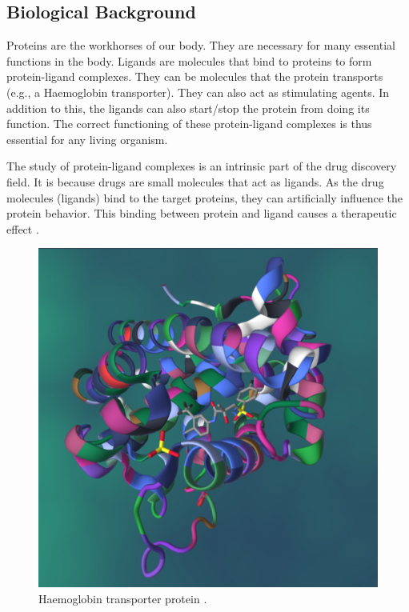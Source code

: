 \documentclass[11pt]{article}
\begin{document}
\subsection{Biological Background}
Proteins are the workhorses of our body.  They are necessary for many essential functions in the body.  Ligands are molecules that bind to proteins to form protein-ligand complexes.  They can be molecules that the protein transports (e.g., a Haemoglobin transporter). They can also act as stimulating agents.  In addition to this, the ligands can also start/stop the protein from doing its function. The correct functioning of these protein-ligand complexes is thus essential for any living organism.

The study of protein-ligand complexes is an intrinsic part of the drug discovery field. It is because drugs are small molecules that act as ligands. As the drug molecules (ligands) bind to the target proteins, they can artificially influence the protein behavior. This binding between protein and ligand causes a therapeutic effect
\cite{proteinlingandbindingpaper}.

\begin{figure}[htb]
  \centering
    \includegraphics[scale=0.15]{images/pl_complex}
    \caption{Haemoglobin transporter protein \cite{PL_complex_introduction}.}
    \label{fig:HaemoglobinTransporterImage}
\end{figure}
\end{document}
